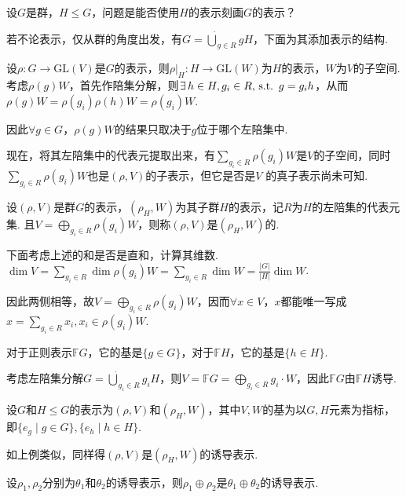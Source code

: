 设$G$是群，$H \leqslant G$，问题是能否使用$H$的表示刻画$G$的表示？\par
若不论表示，仅从群的角度出发，有$G = \dot{\bigcup}_{g \in R} gH$，下面为其添加表示的结构.\par
设$\rho: G \to \mathrm{GL}(V)$是$G$的表示，则$\rho|_H: H \to \mathrm{GL}(W)$为$H$的表示，$W$为$V$的子空间.考虑$\rho(g)W$，首先作陪集分解，则$\exists\, h \in H, g_i \in R, \operatorname{\,\text{s.t.}}\ g = g_i h$，从而$\rho(g)W = \rho(g_i)\rho(h)W = \rho(g_i)W$.\par
因此$\forall g \in G$，$\rho(g)W$的结果只取决于$g$位于哪个左陪集中.\par

现在，将其左陪集中的代表元提取出来，有$\sum_{g_i \in R} \rho(g_i)W$是$V$的子空间，同时$\sum_{g_i \in R} \rho(g_i)W$也是$(\rho, V)$的子表示，但它是否是$V$ 的真子表示尚未可知.\par

\begin{definition}[诱导表示]
    设$(\rho, V)$是群$G$的表示，$(\rho_H, W)$为其子群$H$的表示，记$R$为$H$的左陪集的代表元集.
    且$V = \bigoplus_{g_i \in R} \rho(g_i)W$，则称$(\rho, V)$是$(\rho_H, W)$的.
\end{definition}

下面考虑上述的和是否是直和，计算其维数. $\dim V = \sum_{g_i \in R} \dim \rho(g_i)W = \sum_{g_i \in R} \dim W = \frac{|G|}{|H|} \dim W$.\par
因此两侧相等，故$V = \bigoplus_{g_i \in R} \rho(g_i)W$，因而$\forall x \in V$，$x$都能唯一写成$x = \sum_{g_i \in R} x_i, x_i \in \rho(g_i)W$.\par

\begin{instance}
    对于正则表示$\mathbb{F}G$，它的基是$\{g \in G\}$，对于$\mathbb{F}H$，它的基是$\{h \in H\}$.\par
    考虑左陪集分解$G = \dot{\bigcup}_{g_i \in R} g_i H$，则$V = \mathbb{F}G = \bigoplus_{g_i \in R} g_i \cdot W$，因此$\mathbb{F}G$由$\mathbb{F}H$诱导.
\end{instance}

\begin{instance}
    设$G$和$H \leqslant G$的表示为$(\rho, V)$和$(\rho_H, W)$，其中$V, W$的基为以$G, H$元素为指标，即$\{e_g \mid g \in G\}, \{e_h \mid h \in H\}$.\par
    如上例类似，同样得$(\rho, V)$是$(\rho_H, W)$的诱导表示.
\end{instance}

\begin{property}[直和和诱导可交换]
    设$\rho_1, \rho_2$分别为$\theta_1$和$\theta_2$的诱导表示，则$\rho_1 \oplus \rho_2$是$\theta_1 \oplus \theta_2$的诱导表示.
\end{property}

